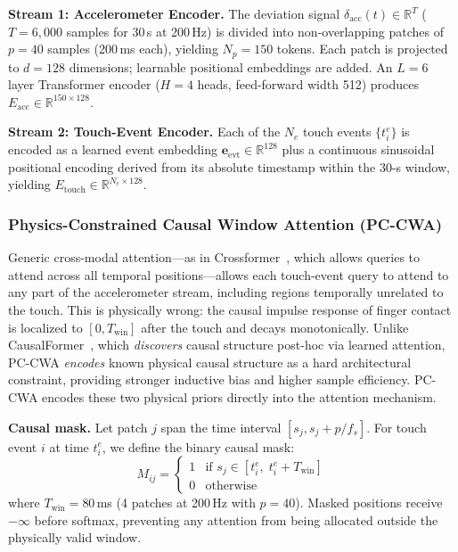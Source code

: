 \noindent\textbf{Stream 1: Accelerometer Encoder.}
The deviation signal $\delta_{\mathrm{acc}}(t) \in \mathbb{R}^T$
($T{=}6{,}000$ samples for 30\,s at 200\,Hz) is divided into
non-overlapping patches of $p{=}40$ samples (200\,ms each), yielding $N_p{=}150$ tokens.%
Each patch is projected to $d{=}128$ dimensions; learnable positional embeddings are added.%
An $L{=}6$ layer Transformer encoder ($H{=}4$ heads, feed-forward width 512) produces
$E_{\mathrm{acc}} \in \mathbb{R}^{150 \times 128}$.%

\noindent\textbf{Stream 2: Touch-Event Encoder.}
Each of the $N_e$ touch events $\{t_i^e\}$ is encoded as a learned event embedding
$\mathbf{e}_{\mathrm{evt}} \in \mathbb{R}^{128}$ plus a continuous sinusoidal positional
encoding derived from its absolute timestamp within the 30-s window, yielding
$E_{\mathrm{touch}} \in \mathbb{R}^{N_e \times 128}$.%

\subsubsection{Physics-Constrained Causal Window Attention (PC-CWA)}
\label{sec:pccwa}

Generic cross-modal attention---as in Crossformer~\cite{crossformer2023}, which allows
queries to attend across all temporal positions---allows each touch-event query to attend
to any part of the accelerometer stream, including regions temporally unrelated to the touch.%
This is physically wrong: the causal impulse response of finger contact is localized to
$[0, T_{\mathrm{win}}]$ after the touch and decays monotonically.%
Unlike CausalFormer~\cite{causalformer2024}, which \textit{discovers} causal structure
post-hoc via learned attention, PC-CWA \textit{encodes} known physical causal structure
as a hard architectural constraint, providing stronger inductive bias and higher
sample efficiency.%
PC-CWA encodes these two physical priors directly into the attention mechanism.%

\noindent\textbf{Causal mask.}
Let patch $j$ span the time interval $[s_j, s_j + p/f_s]$.%
For touch event $i$ at time $t_i^e$, we define the binary causal mask:
\begin{equation}
M_{ij} =
\begin{cases}
1 & \text{if } s_j \in [t_i^e,\; t_i^e + T_{\mathrm{win}}] \\
0 & \text{otherwise}
\end{cases}
\label{eq:mask}
\end{equation}
where $T_{\mathrm{win}} = 80$\,ms (4 patches at 200\,Hz with $p{=}40$).%
Masked positions receive $-\infty$ before softmax, preventing any attention from being
allocated outside the physically valid window.%


